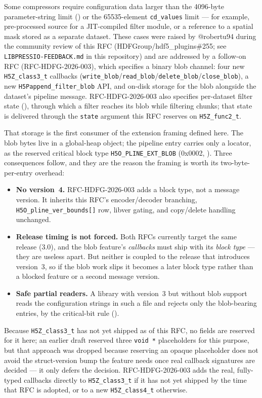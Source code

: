 \documentclass[../RFC-HDFG-2026-001.tex]{subfiles}
\begin{document}
Some compressors require configuration data larger than the 4096-byte
parameter-string limit () or the
65535-element \texttt{cd\_values} limit --- for example, pre-processed
source for a JIT-compiled filter module, or a reference to a spatial mask
stored as a separate dataset.  These cases were raised by @robertu94
during the community review of this RFC (HDFGroup/hdf5\_plugins\#255; see
\texttt{LIBPRESSIO-FEEDBACK.md} in this repository) and are addressed by a
follow-on RFC (RFC-HDFG-2026-003), which specifies a binary blob channel:
four new \texttt{H5Z\_class3\_t} callbacks
(\texttt{write\_blob}/\texttt{read\_blob}/\texttt{delete\_blob}/\texttt{close\_blob}), a new
\texttt{H5Pappend\_filter\_blob} API, and on-disk storage for the blob
alongside the dataset's pipeline message.  RFC-HDFG-2026-003 also
specifies per-dataset filter state (),
through which a filter reaches its blob while filtering chunks; that
state is delivered through the \texttt{state} argument this RFC reserves
on \texttt{H5Z\_func2\_t}.

That storage is the first consumer of the extension framing defined here.
The blob bytes live in a global-heap object; the pipeline entry carries
only a locator, as the reserved critical block type
\texttt{H5O\_PLINE\_EXT\_BLOB} (0x0002,
).  Three consequences follow, and they
are the reason the framing is worth its two-byte-per-entry overhead:

\begin{itemize}
\item \textbf{No version~4.}  RFC-HDFG-2026-003 adds a block type, not a
  message version.  It inherits this RFC's encoder/decoder branching,
  \texttt{H5O\_pline\_ver\_bounds[]} row, libver gating, and copy/delete
  handling unchanged.
\item \textbf{Release timing is not forced.}  Both RFCs currently target
  the same release (3.0), and the blob feature's \emph{callbacks} must
  ship with its \emph{block type} --- they are useless apart.  But neither
  is coupled to the release that introduces version~3, so if the blob work
  slips it becomes a later block type rather than a blocked feature or a
  second message version.
\item \textbf{Safe partial readers.}  A library with version~3 but without
  blob support reads the configuration strings in such a file and rejects
  only the blob-bearing entries, by the critical-bit rule
  ().
\end{itemize}  Because
\texttt{H5Z\_class3\_t} has not yet shipped as of this RFC, no fields are
reserved for it here; an earlier draft reserved three \texttt{void~*}
placeholders for this purpose, but that approach was dropped because
reserving an opaque placeholder does not avoid the struct-version bump the
feature needs once real callback signatures are decided --- it only defers
the decision.  RFC-HDFG-2026-003 adds the real, fully-typed callbacks
directly to \texttt{H5Z\_class3\_t} if it has not yet shipped by the time
that RFC is adopted, or to a new \texttt{H5Z\_class4\_t} otherwise.
\end{document}
